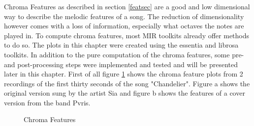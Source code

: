 Chroma Features as described in section \ref{featsec} are a good and low dimensional way to describe the melodic features of a song. The reduction of dimensionality however comes with a loss of information, especially what octaves the notes are played in. To compute chroma features, most MIR toolkits already offer methods to do so. The plots in this chapter were created using the essentia \cite{essentia1} and librosa \cite{librosa1} toolkits. 
In addition to the pure computation of the chroma features, some pre- and post-processing steps were implemented and tested and will be presented later in this chapter. 
First of all figure \ref{fig:chroma1} shows the chroma feature plots from 2 recordings of the first thirty seconds of the song "Chandelier". Figure a shows the original version sung by the artist Sia and figure b shows the features of a cover version from the band Pvris. 
\begin{figure}[htbp]
	\centering
	\caption{Chroma Features}
	\label{fig:chroma1}
\end{figure}

